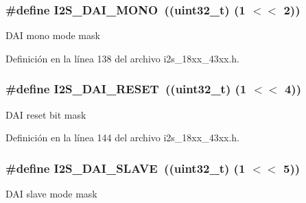 \subsubsection[{\texorpdfstring{I2\+S\+\_\+\+D\+A\+I\+\_\+\+M\+O\+NO}{I2S_DAI_MONO}}]{\setlength{\rightskip}{0pt plus 5cm}\#define I2\+S\+\_\+\+D\+A\+I\+\_\+\+M\+O\+NO~((uint32\+\_\+t) (1 $<$$<$ 2))}\hypertarget{group___i2_s__18_x_x__43_x_x_ga352feb095d028efc44d17f72beacfae5}{}\label{group___i2_s__18_x_x__43_x_x_ga352feb095d028efc44d17f72beacfae5}
D\+AI mono mode mask 

Definición en la línea 138 del archivo i2s\+\_\+18xx\+\_\+43xx.\+h.

\subsubsection[{\texorpdfstring{I2\+S\+\_\+\+D\+A\+I\+\_\+\+R\+E\+S\+ET}{I2S_DAI_RESET}}]{\setlength{\rightskip}{0pt plus 5cm}\#define I2\+S\+\_\+\+D\+A\+I\+\_\+\+R\+E\+S\+ET~((uint32\+\_\+t) (1 $<$$<$ 4))}\hypertarget{group___i2_s__18_x_x__43_x_x_gae57a0b564a399a726a9a6737f5733beb}{}\label{group___i2_s__18_x_x__43_x_x_gae57a0b564a399a726a9a6737f5733beb}
D\+AI reset bit mask 

Definición en la línea 144 del archivo i2s\+\_\+18xx\+\_\+43xx.\+h.

\subsubsection[{\texorpdfstring{I2\+S\+\_\+\+D\+A\+I\+\_\+\+S\+L\+A\+VE}{I2S_DAI_SLAVE}}]{\setlength{\rightskip}{0pt plus 5cm}\#define I2\+S\+\_\+\+D\+A\+I\+\_\+\+S\+L\+A\+VE~((uint32\+\_\+t) (1 $<$$<$ 5))}\hypertarget{group___i2_s__18_x_x__43_x_x_ga664f6b8ac38d7b3a23aae4e7a2fa1c6f}{}\label{group___i2_s__18_x_x__43_x_x_ga664f6b8ac38d7b3a23aae4e7a2fa1c6f}
D\+AI slave mode mask 

